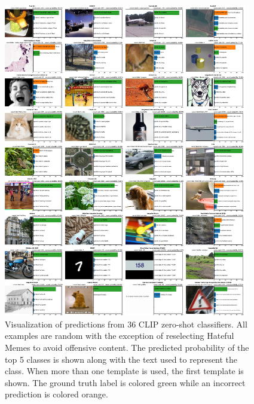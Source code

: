 \documentclass{article}
\begin{document}
\begin{figure}[t]
\begin{center}
\centerline{\includegraphics[width=0.95\textwidth]{final_zero_shot_prediction_vis.pdf}}
\caption{Visualization of predictions from 36 CLIP zero-shot classifiers. All examples are random with the exception of reselecting Hateful Memes to avoid offensive content. The predicted probability of the top 5 classes is shown along with the text used to represent the class. When more than one template is used, the first template is shown. The ground truth label is colored green while an incorrect prediction is colored orange.}
\label{zero_shot_prediction_fig}
\end{center}
\end{figure}
\end{document}
